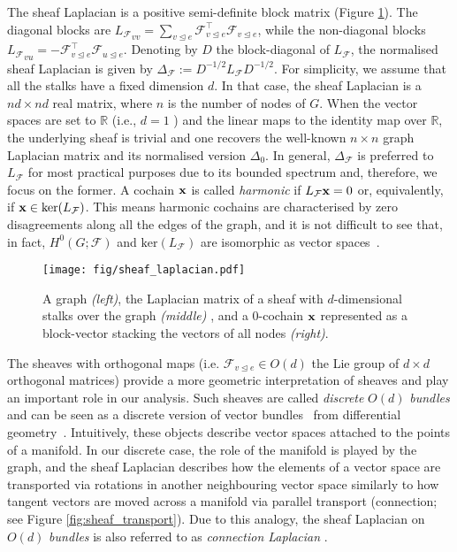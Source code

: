 \documentclass{article}
\def\vx{{\bf{x}}}
\def\gF{{\mathcal{F}}}
\def\sR{{\mathbb{R}}}
\newcommand{\tleq}{\trianglelefteq}
\begin{document}
The sheaf Laplacian is a positive semi-definite block matrix (Figure \ref{fig:sheaf_laplacian}). The diagonal blocks are ${L_{\gF}}_{vv} = \sum_{v \tleq e} \gF_{v \tleq e}^\top \gF_{v \tleq e}$, while the non-diagonal blocks ${L_{\gF}}_{vu} = - \gF_{v \tleq e}^\top \gF_{u \tleq e}$. Denoting by $D$ the block-diagonal of $L_\gF$, the normalised sheaf Laplacian is given by $\Delta_\gF := D^{-1/2}L_\gF D^{-1/2}$. For simplicity, we assume that all the stalks have a fixed dimension $d$. In that case, the sheaf Laplacian is a $nd \times nd$ real matrix, where $n$ is the number of nodes of $G$. When the vector spaces are set to $\sR$ (i.e., $d=1$ ) and the linear maps to the identity map over $\sR$, the underlying sheaf is trivial and one recovers the well-known $n \times n$ graph Laplacian matrix and its normalised version $\Delta_0$. In general, $\Delta_\gF$ is preferred to $L_\gF$ for most practical purposes due to its bounded spectrum and, therefore, we focus on the former. A cochain $\vx$ is called {\em harmonic} if $L_\gF\vx = 0$ or, equivalently, if $\vx \in \mathrm{ker}(L_\gF)$. This means harmonic cochains are characterised by zero disagreements along all the edges of the graph, and it is not difficult to see that, in fact, $H^0(G; \gF)$ and $\mathrm{ker}(L_\gF)$ are isomorphic as vector spaces~\citep{hansen2021opinion}.

\begin{figure}[t]
    \centering
    \texttt{[image: fig/sheaf\_laplacian.pdf]}
    \caption{A graph \textit{(left)}, the Laplacian matrix of a sheaf with $d$-dimensional stalks over the graph \textit{(middle)} , and a $0$-cochain $\vx$ represented as a block-vector stacking the vectors of all nodes  \textit{(right)}.}
    \label{fig:sheaf_laplacian}
    \vspace{-10pt}
\end{figure}

The sheaves with orthogonal maps (i.e. $\gF_{v \tleq e} \in O(d)$ the Lie group of $d\times d$ orthogonal matrices) provide a more geometric interpretation of sheaves and play an important role in our analysis. Such sheaves are called \emph{discrete} $O(d)$ \emph{bundles} and can be seen as a discrete version of vector bundles~\citep{zein2009local, scoccola2021approximate, gao2021geometry} from differential geometry~\citep{tu2011manifolds}. Intuitively, these objects describe vector spaces attached to the points of a manifold. In our discrete case, the role of the manifold is played by the graph, and the sheaf Laplacian describes how the elements of a vector space are transported via rotations in another neighbouring vector space similarly to how tangent vectors are moved across a manifold via parallel transport (connection; see Figure \ref{fig:sheaf_transport}). Due to this analogy, the sheaf Laplacian on $O(d)$ \emph{bundles} is also referred to as {\em connection Laplacian} \citep{singer2012vector}.
\end{document}
